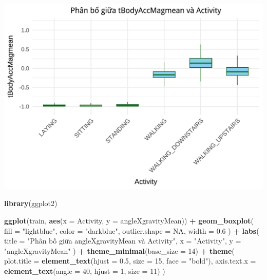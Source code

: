\documentclass[
]{article}
\newenvironment{Shaded}{\begin{snugshade}}{\end{snugshade}}
\newcommand{\AttributeTok}[1]{\textcolor[rgb]{0.13,0.29,0.53}{#1}}
\newcommand{\ConstantTok}[1]{\textcolor[rgb]{0.56,0.35,0.01}{#1}}
\newcommand{\DecValTok}[1]{\textcolor[rgb]{0.00,0.00,0.81}{#1}}
\newcommand{\FloatTok}[1]{\textcolor[rgb]{0.00,0.00,0.81}{#1}}
\newcommand{\FunctionTok}[1]{\textcolor[rgb]{0.13,0.29,0.53}{\textbf{#1}}}
\newcommand{\NormalTok}[1]{#1}
\newcommand{\SpecialCharTok}[1]{\textcolor[rgb]{0.81,0.36,0.00}{\textbf{#1}}}
\newcommand{\StringTok}[1]{\textcolor[rgb]{0.31,0.60,0.02}{#1}}
\begin{document}
\includegraphics{report_files/figure-latex/unnamed-chunk-18-1.pdf}

\begin{Shaded}
\begin{Highlighting}[]
\FunctionTok{library}\NormalTok{(ggplot2)}

\FunctionTok{ggplot}\NormalTok{(train, }\FunctionTok{aes}\NormalTok{(}\AttributeTok{x =}\NormalTok{ Activity, }\AttributeTok{y =}\NormalTok{ angleXgravityMean)) }\SpecialCharTok{+}
  \FunctionTok{geom\_boxplot}\NormalTok{(}
    \AttributeTok{fill =} \StringTok{"lightblue"}\NormalTok{,}
    \AttributeTok{color =} \StringTok{"darkblue"}\NormalTok{,}
    \AttributeTok{outlier.shape =} \ConstantTok{NA}\NormalTok{,}
    \AttributeTok{width =} \FloatTok{0.6}
\NormalTok{  ) }\SpecialCharTok{+}
  \FunctionTok{labs}\NormalTok{(}
    \AttributeTok{title =} \StringTok{"Phân bố giữa angleXgravityMean và Activity"}\NormalTok{,}
    \AttributeTok{x =} \StringTok{"Activity"}\NormalTok{,}
    \AttributeTok{y =} \StringTok{"angleXgravityMean"}
\NormalTok{  ) }\SpecialCharTok{+}
  \FunctionTok{theme\_minimal}\NormalTok{(}\AttributeTok{base\_size =} \DecValTok{14}\NormalTok{) }\SpecialCharTok{+}
  \FunctionTok{theme}\NormalTok{(}
    \AttributeTok{plot.title =} \FunctionTok{element\_text}\NormalTok{(}\AttributeTok{hjust =} \FloatTok{0.5}\NormalTok{, }\AttributeTok{size =} \DecValTok{15}\NormalTok{, }\AttributeTok{face =} \StringTok{"bold"}\NormalTok{),}
    \AttributeTok{axis.text.x =} \FunctionTok{element\_text}\NormalTok{(}\AttributeTok{angle =} \DecValTok{40}\NormalTok{, }\AttributeTok{hjust =} \DecValTok{1}\NormalTok{, }\AttributeTok{size =} \DecValTok{11}\NormalTok{)}
\NormalTok{  )}
\end{Highlighting}
\end{Shaded}
\end{document}
